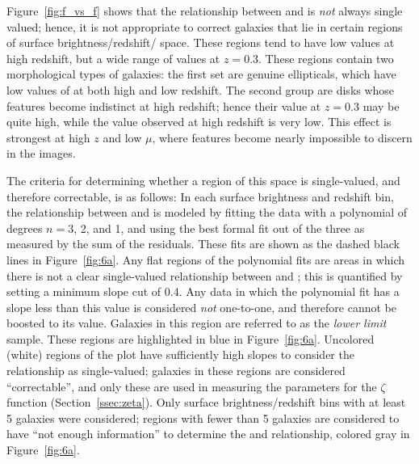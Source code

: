 \documentclass[twocolumn]{aastex6}
\begin{document}
Figure~\ref{fig:f_vs_f} shows that the relationship between \ffeaturesz{} and \ffeaturesrest{} is \emph{not} always single valued; hence, it is not appropriate to correct galaxies that lie in certain regions of surface brightness/redshift/\ffeatures{} space. These regions tend to have low \ffeatures{} values at high redshift, but a wide range of values at $z=0.3$. These regions contain two morphological types of galaxies: the first set are genuine ellipticals, which have low values of \ffeatures{} at both high and low redshift. The second group are disks whose features become indistinct at high redshift; hence their \ffeatures{} value at $z=0.3$ may be quite high, while the value observed at high redshift is very low. This effect is strongest at high $z$ and low $\mu$, where features become nearly impossible to discern in the images.

The criteria for determining whether a region of this space is single-valued, and therefore correctable, is as follows: In each surface brightness and redshift bin, the relationship between \ffeaturesz{} and \ffeaturesrest{} is modeled by fitting the data with a polynomial of degrees $n=3$, 2, and 1, and using the best formal fit out of the three as measured by the sum of the residuals. These fits are shown as the dashed black lines in Figure~\ref{fig:6a}. Any flat regions of the polynomial fits are areas in which there is not a clear single-valued relationship between \ffeaturesz{} and \ffeaturesrest; this is quantified by setting a minimum slope cut of 0.4. Any data in which the polynomial fit has a slope less than this value is considered \emph{not} one-to-one, and therefore \ffeaturesz{} cannot be boosted to its \ffeaturesrest{} value. Galaxies in this region are referred to as the \emph{lower limit} sample. These regions are highlighted in blue in Figure~\ref{fig:6a}. Uncolored (white) regions of the plot have sufficiently high slopes to consider the relationship as single-valued; galaxies in these regions are considered ``correctable'', and only these are used in measuring the parameters for the $\zeta$ function (Section~\ref{ssec:zeta}). Only surface brightness/redshift bins with at least 5 galaxies were considered; regions with fewer than 5 galaxies are considered to have ``not enough information'' to determine the \ffeaturesz{} and \ffeaturesrest{} relationship, colored gray in Figure~\ref{fig:6a}.
\end{document}
